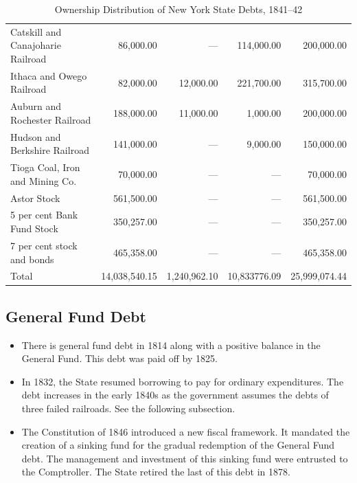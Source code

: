 \documentclass[11pt]{article}
\newcommand{\STRUT}{\rule{0in}{3ex}}
\begin{document}
\begin{table}[htbp]
\begin{tabular}{lrrrr}
Catskill and Canajoharie Railroad & 86,000.00    & ---         & 114,000.00     & 200,000.00 \\
Ithaca and Owego Railroad         & 82,000.00    & 12,000.00   & 221,700.00     & 315,700.00 \\
Auburn and Rochester Railroad     & 188,000.00   & 11,000.00   & 1,000.00       & 200,000.00 \\
Hudson and Berkshire Railroad     & 141,000.00   & ---         & 9,000.00       & 150,000.00 \\
Tioga Coal, Iron and Mining Co.   & 70,000.00    & ---         & ---            & 70,000.00 \\
Astor Stock                       & 561,500.00   & ---         & ---            & 561,500.00 \\
5 per cent Bank Fund Stock        & 350,257.00   & ---         & ---            & 350,257.00 \\
7 per cent stock and bonds        & 465,358.00  &  ---         & ---            & 465,358.00\\
\hline
Total                             & 14,038,540.15 & 1,240,962.10 & 10,833776.09 & 25,999,074.44\STRUT 
\end{tabular}
\caption{Ownership Distribution of New York State Debts, 1841--42}
\label{table:ny_state_debt_1841_42}
\end{table}

\subsection{General Fund Debt}

\begin{itemize}

\item There is general fund debt in 1814 along with a positive balance in the General Fund.  This debt was paid off by 1825. 

\item In 1832, the State resumed borrowing to pay for ordinary expenditures.  The debt increases in the early 1840s as the government assumes the debts
of three failed railroads.  See the following subsection.


\item The Constitution of 1846 introduced a new fiscal framework.  It mandated the creation of a sinking fund for the gradual redemption of the General Fund debt.  
The management and investment of this sinking fund were entrusted to the Comptroller.  
The State retired the last of this debt in 1878.  

\end{itemize}
\end{document}
